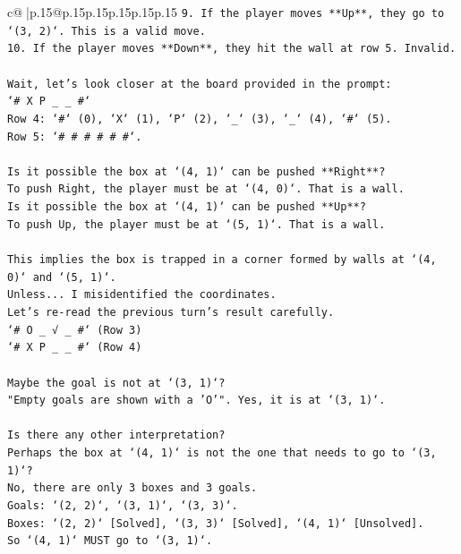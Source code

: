 \documentclass{article}
\begin{document}
{\begin{supertabular}{c@{$\;$}|p{.15\linewidth}@{}p{.15\linewidth}p{.15\linewidth}p{.15\linewidth}p{.15\linewidth}p{.15\linewidth}}
{{{\texttt{9.  If the player moves **Up**, they go to `(3, 2)`. This is a valid move.} \\
\texttt{10. If the player moves **Down**, they hit the wall at row 5. Invalid.} \\
\\ 
\texttt{Wait, let's look closer at the board provided in the prompt:} \\
\texttt{`\# X P \_ \_ \#`} \\
\texttt{Row 4: `\#` (0), `X` (1), `P` (2), `\_` (3), `\_` (4), `\#` (5).} \\
\texttt{Row 5: `\# \# \# \# \# \#`.} \\
\\ 
\texttt{Is it possible the box at `(4, 1)` can be pushed **Right**?} \\
\texttt{To push Right, the player must be at `(4, 0)`. That is a wall.} \\
\texttt{Is it possible the box at `(4, 1)` can be pushed **Up**?} \\
\texttt{To push Up, the player must be at `(5, 1)`. That is a wall.} \\
\\ 
\texttt{This implies the box is trapped in a corner formed by walls at `(4, 0)` and `(5, 1)`.} \\
\texttt{Unless... I misidentified the coordinates.} \\
\texttt{Let's re{-}read the previous turn's result carefully.} \\
\texttt{`\# O \_ √ \_ \#` (Row 3)} \\
\texttt{`\# X P \_ \_ \#` (Row 4)} \\
\\ 
\texttt{Maybe the goal is not at `(3, 1)`?} \\
\texttt{"Empty goals are shown with a 'O'". Yes, it is at `(3, 1)`.} \\
\\ 
\texttt{Is there any other interpretation?} \\
\texttt{Perhaps the box at `(4, 1)` is not the one that needs to go to `(3, 1)`?} \\
\texttt{No, there are only 3 boxes and 3 goals.} \\
\texttt{Goals: `(2, 2)`, `(3, 1)`, `(3, 3)`.} \\
\texttt{Boxes: `(2, 2)` {[}Solved{]}, `(3, 3)` {[}Solved{]}, `(4, 1)` {[}Unsolved{]}.} \\
\texttt{So `(4, 1)` MUST go to `(3, 1)`.} \\
}}}
\end{supertabular}}
\end{document}
